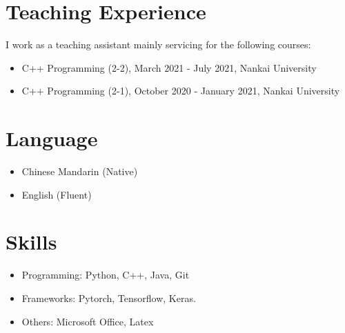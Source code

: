 \documentclass[a4paper,12pt]{article} %
\begin{document}

\vspace{-5pt}
\section{Teaching Experience}
I work as a teaching assistant mainly servicing for the following courses:
\vspace{-5pt}
\begin{itemize}
\item {C++ Programming (2-2), March 2021 - July 2021, Nankai University}
\vspace{-5pt}
\item {C++ Programming (2-1), October 2020 - January 2021, Nankai University}
\end{itemize}


\vspace{-5pt}
\section{Language}
\begin{itemize}
\item {Chinese Mandarin (Native)}
\vspace{-5pt}
\item {English (Fluent)}
\end{itemize}

\vspace{-5pt}
\section{Skills}
\begin{itemize}
\item {Programming: Python, C++, Java, Git}
\vspace{-5pt}
\item {Frameworks: Pytorch, Tensorflow, Keras.}
\vspace{-5pt}
\item {Others: Microsoft Office, Latex}
\end{itemize}
\end{document}
